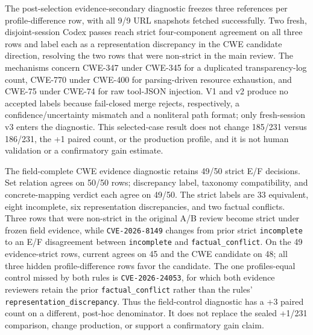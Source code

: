 The post-selection evidence-secondary diagnostic freezes three references per profile-difference row, with all 9/9 URL snapshots fetched successfully. Two fresh, disjoint-session Codex passes reach strict four-component agreement on all three rows and label each as a representation discrepancy in the CWE candidate direction, resolving the two rows that were non-strict in the main review. The mechanisms concern CWE-347 under CWE-345 for a duplicated transparency-log count, CWE-770 under CWE-400 for parsing-driven resource exhaustion, and CWE-75 under CWE-74 for raw tool-JSON injection. V1 and v2 produce no accepted labels because fail-closed merge rejects, respectively, a confidence/uncertainty mismatch and a nonliteral path format; only fresh-session v3 enters the diagnostic. This selected-case result does not change 185/231 versus 186/231, the +1 paired count, or the production profile, and it is not human validation or a confirmatory gain estimate.

The field-complete CWE evidence diagnostic retains 49/50 strict E/F decisions. Set relation agrees on 50/50 rows; discrepancy label, taxonomy compatibility, and concrete-mapping verdict each agree on 49/50. The strict labels are 33 equivalent, eight incomplete, six representation discrepancies, and two factual conflicts. Three rows that were non-strict in the original A/B review become strict under frozen field evidence, while \texttt{CVE-2026-8149} changes from prior strict \texttt{incomplete} to an E/F disagreement between \texttt{incomplete} and \texttt{factual\_conflict}. On the 49 evidence-strict rows, current agrees on 45 and the CWE candidate on 48; all three hidden profile-difference rows favor the candidate. The one profiles-equal control missed by both rules is \texttt{CVE-2026-24053}, for which both evidence reviewers retain the prior \texttt{factual\_conflict} rather than the rules' \texttt{representation\_discrepancy}. Thus the field-control diagnostic has a +3 paired count on a different, post-hoc denominator. It does not replace the sealed +1/231 comparison, change production, or support a confirmatory gain claim.

